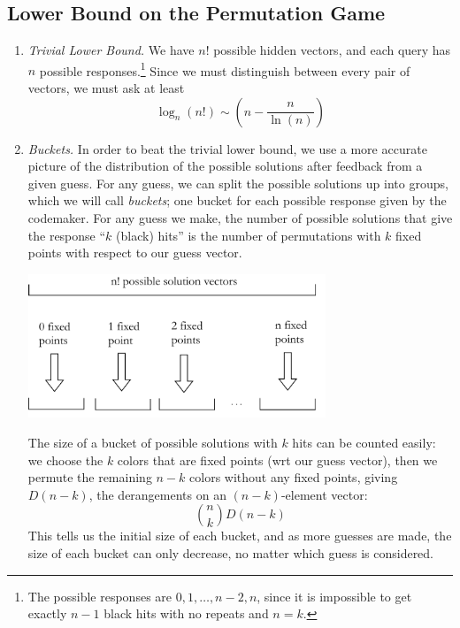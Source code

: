 \documentclass[12pt, a4paper]{article}
\begin{document}
\subsection{Lower Bound on the Permutation Game}
\begin{enumerate}
\item \textit{Trivial Lower Bound.}
	We have $n!$ possible hidden vectors, and each query has $n$ possible
	responses.\footnote{The possible responses are $0, 1, \ldots, n-2, n$, since it is
	impossible to get exactly $n-1$ black hits with no repeats and $n=k$.}
	Since we must distinguish between every pair of vectors, we must ask at least
		\begin{equation*}
		\log_{n}(n!)\sim \left(n-\frac{n}{\ln(n)}\right)
		\end{equation*}
	
	\item\textit{Buckets.}
	In order to beat the trivial lower bound, we use a more accurate picture
	of the distribution of the possible solutions after feedback from a given guess.
	For any guess, we can split the possible solutions up into groups, which
	we will call \textit{buckets}; one bucket for each possible response given by
	the codemaker. For any guess we make, the number of possible solutions that give
	the response ``$k$ (black) hits'' is the number of permutations with $k$ fixed
	points with respect to our guess vector.
	\begin{center}
	\includegraphics[keepaspectratio=true, width=0.7\textwidth]{buckets}
	\end{center}
	The size of a bucket of possible
	solutions with $k$ hits can be counted easily: we choose the $k$ colors that are
	fixed points (wrt our guess vector), then we permute the remaining $n-k$ colors
	without any fixed points, giving $D(n - k)$, the derangements on an $(n-k)$-element
	vector:
		\begin{equation*}
		\binom{n}{k}D(n-k)
		\end{equation*}
	This tells us the initial size of each bucket, and as more guesses are
	made, the size of each bucket can only decrease, no matter which guess is
	considered.
	

\end{enumerate}
\end{document}

